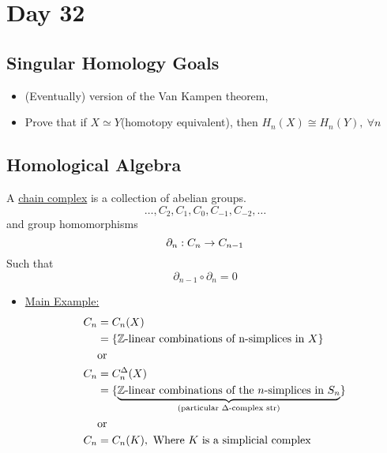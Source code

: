 \documentclass[../notes.tex]{subfiles}
\begin{document}
\section{Day 32}
\subsection{Singular Homology Goals}
\begin{itemize}
    \item (Eventually) version of the Van Kampen theorem,
    \item Prove that if $X\simeq Y$(homotopy equivalent), then
        $H_n(X)\cong H_n(Y),\ \forall n$
\end{itemize}
\subsection{Homological Algebra}
\begin{definition}
    A \underline{chain complex} is a collection of abelian groups.
    \[
        \dots,C_2,C_1,C_0,C_{-1},C_{-2},\dots
    \]
    and group homomorphisms
    \[
        \partial_n:C_n\rightarrow C_{n-1}\\
    \]
    Such that
    \[
        \partial_{n-1}\circ\partial_n=0
    \]
    \begin{center}
    \end{center}
\end{definition}
\begin{itemize}
    \item \underline{Main Example:}\\
        \begin{align*}
            C_n&=C_n(X)\\
            &=\{\text{$\mathbb{Z}$-linear combinations of n-simplices in $X$}\}\\
            &\text{or}\\
            C_n&=C_n^{\Delta}(X)\\
            &=\{\underbrace{\text{$\mathbb{Z}$-linear combinations of the $n$-simplices in $S_n$}}_{
                \text{(particular $\Delta$-complex str)}
            }\}\\
            &\text{or}\\
            C_n&=C_n(K),\ \text{Where $K$ is a simplicial complex}\\
        \end{align*}
\end{itemize}
\end{document}
